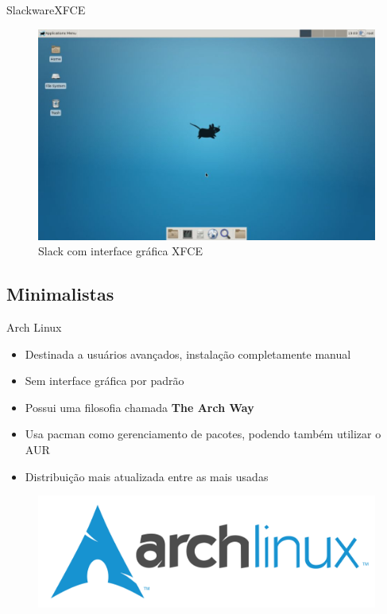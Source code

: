 \documentclass{beamer}
\begin{document}
\begin{frame}{Slackware}{XFCE}
 \begin{figure}[h!]
        \centering
        \includegraphics[scale=0.27]{slackXFCE.jpg}
        \caption{Slack com interface gráfica XFCE}
        \label{fig:Comando ls}
    \end{figure}
\end{frame}

\subsection{Minimalistas}

\begin{frame}{Arch Linux}
  \begin{itemize}
    \item{Destinada a usuários avançados, instalação completamente manual}
    \item{Sem interface gráfica por padrão}
    \item{Possui uma filosofia chamada \textbf{The Arch Way}}
    \item{Usa pacman como gerenciamento de pacotes, podendo também utilizar o AUR}
    \item{Distribuição mais atualizada entre as mais usadas}
  \end{itemize}
    \begin{figure}[h!]
        \centering
        \includegraphics[scale=0.20]{archlinux.png}
    \end{figure}
\end{frame}
\end{document}
